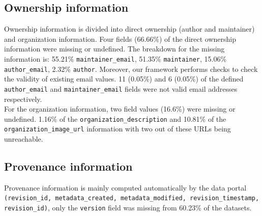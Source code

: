 \documentclass[runningheads,a4paper]{llncs}
\begin{document}
\subsection{Ownership information} Ownership information is divided into direct ownership (author and maintainer) and organization information. Four fields (66.66\%) of the direct ownership information were missing or undefined. The breakdown for the missing information is: 55.21\% \texttt{maintainer\_email}, 51.35\% \texttt{maintainer}, 15.06\% \texttt{author\_email}, 2.32\% \texttt{author}. Moreover, our framework performs checks to check the validity of existing email values. 11 (0.05\%) and 6 (0.05\%) of the defined \texttt{author\_email} and \texttt{maintainer\_email} fields were not valid email addresses respectively.\\
For the organization information, two field values (16.6\%) were missing or undefined. 1.16\% of the \texttt{organization\_description} and 10.81\% of the \texttt{organization\-\_image\_url} information with two out of these URLs being unreachable.

\subsection{Provenance information} Provenance information is mainly computed automatically by the data portal \texttt{(revision\_id, metadata\_created, metadata\_modified, revision\_timestamp, revision\_id)}, only the \texttt{version} field was missing from 60.23\% of the datasets.
\end{document}
